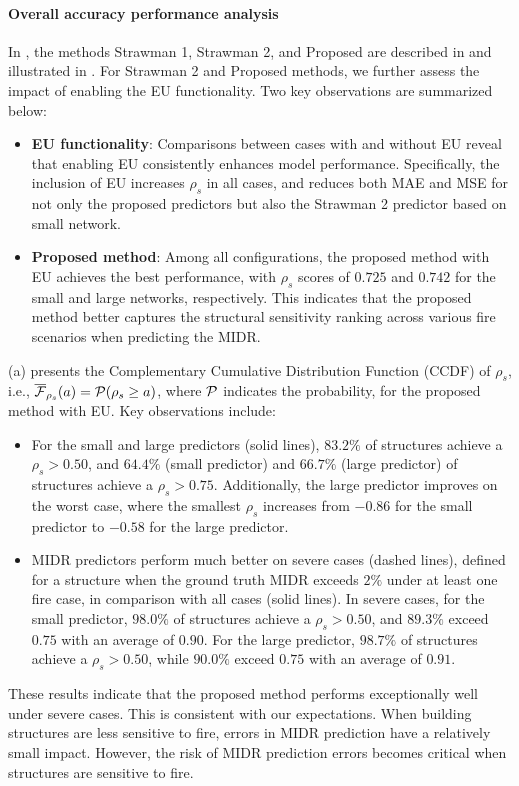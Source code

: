 \paragraph{Overall accuracy performance analysis}
In , the methods Strawman 1, Strawman 2, and Proposed are described in  and illustrated in . For Strawman 2 and Proposed methods, we further assess the impact of enabling the EU functionality. Two key observations are summarized below:
\begin{itemize}
    \item {\bf{EU functionality}}: Comparisons between cases with and without EU reveal that enabling EU consistently enhances model performance. Specifically, the inclusion of EU increases $\rho_s$ in all cases, and reduces both MAE and MSE for not only the proposed predictors but also the Strawman 2 predictor based on small network.
    \item {\bf{Proposed method}}: Among all configurations, the proposed method with EU achieves the best performance, with $\rho_s$ scores of $0.725$ and $0.742$ for the small and large networks, respectively. This indicates that the proposed method better captures the structural sensitivity ranking across various fire scenarios when predicting the MIDR.
\end{itemize}

(a) presents the Complementary Cumulative Distribution Function (CCDF) of $\rho_s$, i.e., ${\overline{{\cal{F}}}}_{\rho_s}(a)={\cal{P}}(\rho_s \ge a)$, where $\cal{P}$ indicates the probability, for the proposed method with EU. Key observations include:
\begin{itemize}
\item For the small and large predictors (solid lines), $83.2\%$ of structures achieve a $\rho_s > 0.50$, and $64.4\%$ (small predictor) and $66.7\%$ (large predictor) of structures achieve a $\rho_s > 0.75$. Additionally, the large predictor improves on the worst case, where the smallest $\rho_s$ increases from $-0.86$ for the small predictor to $-0.58$ for the large predictor.
\item MIDR predictors perform much better on severe cases (dashed lines), defined for a structure when the ground truth MIDR exceeds $2\%$ under at least one fire case, in comparison with all cases (solid lines). In severe cases, for the small predictor, $98.0\%$ of structures achieve a $\rho_s > 0.50$, and $89.3\%$ exceed $0.75$ with an average of $0.90$. For the large predictor, $98.7\%$ of structures achieve a $\rho_s > 0.50$, while $90.0\%$ exceed $0.75$ with an average of $0.91$.
\end{itemize}
These results indicate that the proposed method performs exceptionally well under severe cases. This is consistent with our expectations. When building structures are less sensitive to fire, errors in MIDR prediction have a relatively small impact. However, the risk of MIDR prediction errors becomes critical when structures are sensitive to fire. 

